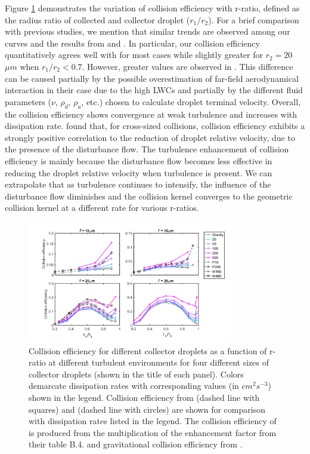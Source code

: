 Figure \ref{fig:cer_ratio} demonstrates the variation of collision efficiency with r-ratio, defined as the radius ratio of collected and collector droplet ($r_1/r_2$). For a brief comparison with previous studies, we mention that similar trends are observed among our curves and the results from \citet{Pinsky2008} and \citet{Wang2008}. In particular, our collision efficiency quantitatively agrees well with \citet{Pinsky2008} for most cases while slightly greater for $r_2=20$ $\mu m$ when $r_1/r_2 < 0.7$. However, greater values are observed in \citet{Wang2008}. This difference can be caused partially by the possible overestimation of far-field aerodynamical interaction in their case due to the high LWCs and partially by the different fluid parameters ($\nu$, $\rho_d$, $\rho_a$, etc.) chosen to calculate droplet terminal velocity. Overall, the collision efficiency shows convergence at weak turbulence and increases with dissipation rate. \citet{Wang2008} found that, for cross-sized collisions, collision efficiency exhibits a strongly positive correlation to the reduction of droplet relative velocity, due to the presence of the disturbance flow. The turbulence enhancement of collision efficiency is mainly because the disturbance flow becomes less effective in reducing the droplet relative velocity when turbulence is present. We can extrapolate that as turbulence continues to intensify, the influence of the disturbance flow diminishes and the collision kernel converges to the geometric collision kernel at a different rate for various r-ratios.  


\begin{figure}[ht]
\centering
\includegraphics[width=0.8\textwidth]{Figures/Chap3/cer_ratio.png}
\caption{Collision efficiency for different collector droplets as a function of r-ratio at different turbulent environments for four different sizes of collector droplets (shown in the title of each panel). Colors demarcate dissipation rates with corresponding values  (in $cm^2s^{-3}$) shown in the legend. Collision efficiency from \citet{Pinsky2008} (dashed line with squares) and \citet{Wang2008} (dashed line with circles) are shown for comparison with dissipation rates listed in the legend. The collision efficiency of \citet{Wang2008} is produced from the multiplication of the enhancement factor from their table B.4. and gravitational collision efficiency from \citet{Wang2005a}. } \label{fig:cer_ratio}
\end{figure}

